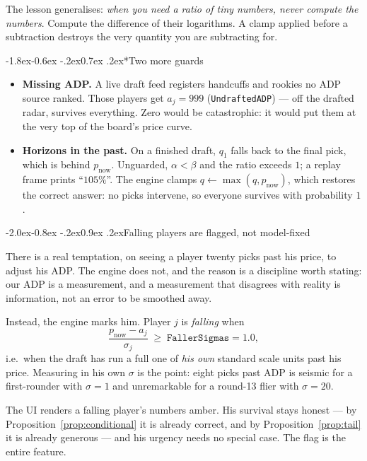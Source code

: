 \documentclass[10pt,a4paper]{article}
\makeatletter
\theoremstyle{plain}
\theoremstyle{definition}
\theoremstyle{remark}
\newcommand{\code}[1]{\texttt{\small #1}}
\renewcommand\subsection{\@startsection{subsection}{2}{\z@}%
  {-2.0ex\@plus -0.8ex \@minus -.2ex}{0.9ex \@plus .2ex}{\normalfont\large\bfseries}}
\renewcommand\subsubsection{\@startsection{subsubsection}{3}{\z@}%
  {-1.8ex\@plus -0.6ex \@minus -.2ex}{0.7ex \@plus .2ex}{\normalfont\normalsize\bfseries}}
\makeatother
\begin{document}
The lesson generalises: \emph{when you need a ratio of tiny numbers, never compute the
numbers}. Compute the difference of their logarithms. A clamp applied before a
subtraction destroys the very quantity you are subtracting for.

\subsubsection*{Two more guards}

\begin{itemize}
\item \textbf{Missing ADP.} A live draft feed registers handcuffs and rookies no ADP
source ranked. Those players get $a_j = 999$ (\code{UndraftedADP}) --- off the drafted
radar, survives everything. Zero would be catastrophic: it would put them at the very
top of the board's price curve.

\item \textbf{Horizons in the past.} On a finished draft, $q_1$ falls back to the final
pick, which is behind $p_{\text{now}}$. Unguarded, $\alpha < \beta$ and the ratio
exceeds $1$; a replay frame prints ``$105\%$''. The engine clamps $q \gets
\max(q, p_{\text{now}})$, which restores the correct answer: no picks intervene, so
everyone survives with probability $1$.
\end{itemize}

\subsection{Falling players are flagged, not model-fixed}

There is a real temptation, on seeing a player twenty picks past his price, to adjust
his ADP. The engine does not, and the reason is a discipline worth stating: our ADP is
a measurement, and a measurement that disagrees with reality is information, not an
error to be smoothed away.

Instead, the engine marks him. Player $j$ is \emph{falling} when
\begin{equation}
\frac{p_{\text{now}} - a_j}{\sigma_j} \;\ge\; \texttt{FallerSigmas} = 1.0,
\label{eq:falling}
\end{equation}
i.e.\ when the draft has run a full one of \emph{his own} standard scale units past his
price. Measuring in his own $\sigma$ is the point: eight picks past ADP is seismic for a
first-rounder with $\sigma = 1$ and unremarkable for a round-13 flier with $\sigma = 20$.

The UI renders a falling player's numbers amber. His survival stays honest --- by
Proposition~\ref{prop:conditional} it is already correct, and by
Proposition~\ref{prop:tail} it is already generous --- and his urgency needs no special
case. The flag is the entire feature.
\end{document}
